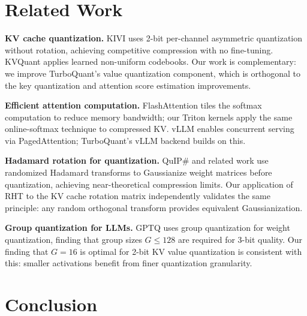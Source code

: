\documentclass{article}
\begin{document}

\section{Related Work}
\label{sec:related}

\textbf{KV cache quantization.}
KIVI \citep{liu2024kivi} uses 2-bit per-channel asymmetric quantization without rotation, achieving competitive compression with no fine-tuning. KVQuant \citep{hooper2024kvquant} applies learned non-uniform codebooks. Our work is complementary: we improve TurboQuant's value quantization component, which is orthogonal to the key quantization and attention score estimation improvements.

\textbf{Efficient attention computation.}
FlashAttention \citep{dao2022flashattention} tiles the softmax computation to reduce memory bandwidth; our Triton kernels apply the same online-softmax technique to compressed KV. vLLM \citep{kwon2023vllm} enables concurrent serving via PagedAttention; TurboQuant's vLLM backend builds on this.

\textbf{Hadamard rotation for quantization.}
QuIP\# \citep{tseng2024quip} and related work use randomized Hadamard transforms to Gaussianize weight matrices before quantization, achieving near-theoretical compression limits. Our application of RHT to the KV cache rotation matrix independently validates the same principle: any random orthogonal transform provides equivalent Gaussianization.

\textbf{Group quantization for LLMs.}
GPTQ \citep{frantar2023gptq} uses group quantization for weight quantization, finding that group sizes $G \leq 128$ are required for 3-bit quality. Our finding that $G = 16$ is optimal for 2-bit KV value quantization is consistent with this: smaller activations benefit from finer quantization granularity.


\section{Conclusion}
\end{document}
